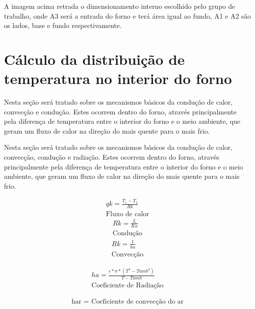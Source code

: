 A imagem acima retrada o dimensionamento interno escolhido pelo grupo de trabalho, onde A3 será a entrada do forno e terá área igual ao fundo, A1 e A2 são os lados, base e fundo respectivamente.

\section{Cálculo da distribuição de temperatura no interior do forno}

Nesta seção será tratado sobre os mecanismos básicos da condução de calor, convecção e condução. Estes ocorrem dentro do forno, através principalmente pela diferença de temperatura entre o interior do forno e o meio ambiente, que geram um fluxo de calor na direção do mais quente para o mais frio.

Nesta seção será tratado sobre os mecanismos básicos da condução de calor, convecção, condução e radiação. Estes ocorrem dentro do forno, através principalmente pela diferença de temperatura entre o interior do forno e o meio ambiente, que geram um fluxo de calor na direção do mais quente para o mais frio.

\begin{gather}
	qk = \frac{T_1 - T_2}{Rk} \\
    \text{Fluxo de calor}
    \nonumber
\end{gather}
\begin{gather}
	Rk = \frac{L}{Ka} \\
    \text{Condu\c{c}\~ao}
    \nonumber
\end{gather}
\begin{gather}
	Rk = \frac{1}{ha} \\
    \text{Convec\c{c}\~ao}
    \nonumber
\end{gather}

\begin{gather}
	ha = \frac{\epsilon * \sigma *(T^{4}-Tamb^{4})}{T - Tamb} \\
    \text{Coeficiente de Radia\c{c}\~ao} \nonumber
\end{gather}

\begin{gather}
    \text{har = Coeficiente de convec\c{c}\~ao do ar} \nonumber
\end{gather}

